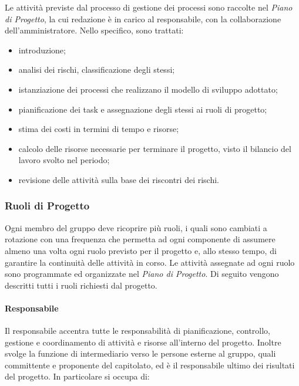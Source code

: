 		Le attività previste dal processo di gestione dei processi sono raccolte nel \textit{Piano di Progetto}, la cui redazione è in carico al responsabile, con la collaborazione dell'amministratore.
		\newline
		Nello specifico, sono trattati:
		
		\begin{itemize}
			\item introduzione;
			\item analisi dei rischi, classificazione degli stessi;
			\item istanziazione dei processi che realizzano il modello di sviluppo adottato;
			\item pianificazione dei task e assegnazione degli stessi ai ruoli di progetto;
			\item stima dei costi in termini di tempo e risorse;
			\item calcolo delle risorse necessarie per terminare il progetto, visto il bilancio del lavoro svolto nel periodo;
			\item revisione delle attività sulla base dei riscontri dei rischi.
		\end{itemize}
	
	\subsubsection{Ruoli di Progetto}
	
		Ogni membro del gruppo deve ricoprire più ruoli, i quali sono cambiati a rotazione con una frequenza che permetta ad ogni componente di assumere almeno una volta ogni ruolo previsto per il progetto e, allo stesso tempo, di garantire la continuità delle attività in corso.
		\newline
		Le attività assegnate ad ogni ruolo sono programmate ed organizzate nel \textit{Piano di Progetto}.
		\newline
		Di seguito vengono descritti tutti i ruoli richiesti dal progetto.
	
		\paragraph{Responsabile}
		
			Il responsabile accentra tutte le responsabilità di pianificazione, controllo, gestione e coordinamento di attività e risorse all'interno del progetto. Inoltre svolge la funzione di intermediario verso le persone esterne al gruppo, quali committente e proponente del capitolato, ed è il responsabile ultimo dei risultati del progetto.
			\newline
			In particolare si occupa di:
			
